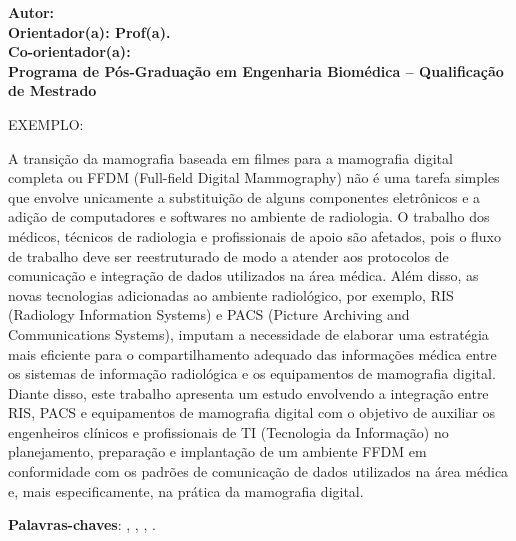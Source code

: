 \begin{resumo}

\begin{center}
\textbf{\imprimirtitulo}
\end{center}

\begin{flushleft}
\footnotesize
\textbf{Autor: \imprimirautor }\\
\textbf{Orientador(a): Prof(a). \imprimirorientador }\\
\textbf{Co-orientador(a): \imprimirmembroCoorientador} \\
\textbf{Programa de Pós-Graduação em Engenharia Biomédica – Qualificação de Mestrado }\\
\textbf{\imprimirlocal \imprimirdata }



EXEMPLO:
\end{flushleft}

A transição da mamografia baseada em filmes para a mamografia digital completa ou
FFDM (Full-field Digital Mammography) não é uma tarefa simples que envolve
unicamente a substituição de alguns componentes eletrônicos e a adição de computadores e
softwares no ambiente de radiologia. O trabalho dos médicos, técnicos de radiologia e
profissionais de apoio são afetados, pois o fluxo de trabalho deve ser reestruturado de
modo a atender aos protocolos de comunicação e integração de dados utilizados na área
médica. Além disso, as novas tecnologias adicionadas ao ambiente radiológico, por
exemplo, RIS (Radiology Information Systems) e PACS (Picture Archiving and
Communications Systems), imputam a necessidade de elaborar uma estratégia mais
eficiente para o compartilhamento adequado das informações médica entre os sistemas de
informação radiológica e os equipamentos de mamografia digital. Diante disso, este
trabalho apresenta um estudo envolvendo a integração entre RIS, PACS e equipamentos de
mamografia digital com o objetivo de auxiliar os engenheiros clínicos e profissionais de TI
(Tecnologia da Informação) no planejamento, preparação e implantação de um ambiente
FFDM em conformidade com os padrões de comunicação de dados utilizados na área
médica e, mais especificamente, na prática da mamografia digital.

\vspace{\onelineskip}
    
 \noindent
 \textbf{Palavras-chaves}: \imprimirpalavrachaveum, \imprimirpalavrachavedois, 
			    \imprimirpalavrachavetres, \imprimirpalavrachavequatro.
\end{resumo}

